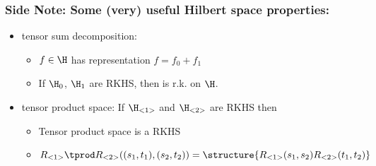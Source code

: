 \begin{frame}
\frametitle{Side Note: Some (very) useful Hilbert space properties:}

\begin{itemize}
\item tensor sum decomposition: 
	\begin{itemize}
	\item $f \in \H$ has representation $f = f_0 + f_1$
	\item If $\H_0$, $\H_1$ are RKHS, then  is r.k. on $\H$.
	\end{itemize}
	\vspace{1cm}
\item tensor product space: If $\H_{<1>}$ and $\H_{<2>}$ are RKHS then
\begin{itemize}
	\item Tensor product space  is a RKHS 
	\item $R_{<1>}\tprod R_{<2>}((s_1, t_1), (s_2, t_2)) = \structure{R_{<1>}(s_1, s_2)R_{<2>}(t_1, t_2)}$
	\end{itemize}
\end{itemize}
\end{frame}

